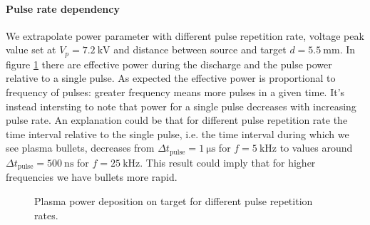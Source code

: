 \paragraph{Pulse rate dependency}
We extrapolate power parameter with different pulse repetition rate, voltage peak value set at $V_{p} = \SI{7.2}{\kilo\volt}$ and distance between source and target $d = \SI{5.5}{\milli\meter}$. In figure \ref{fig:Pfr} there are effective power during the discharge and the pulse power relative to a single pulse. As expected the effective power is proportional to frequency of pulses: greater frequency means more pulses in a given time. It's instead intersting to note that power for a single pulse decreases with increasing pulse rate. 
An explanation could be that for different pulse repetition rate the time interval relative to the single pulse, i.e. the time interval during which we see plasma bullets, decreases from $\Delta t_{\text{pulse}} = \SI{1}{\micro\second}$ for $f = \SI{5}{\kilo\hertz}$ to values around $\Delta t_{\text{pulse}} = \SI{500}{\nano\second}$ for $f = \SI{25}{\kilo\hertz}$. This result could imply that for higher frequencies we have bullets more rapid.
\begin{figure}
 \centering
 \caption{Plasma power deposition on target for different pulse repetition rates.}
 \label{fig:Pfr}
\end{figure}


